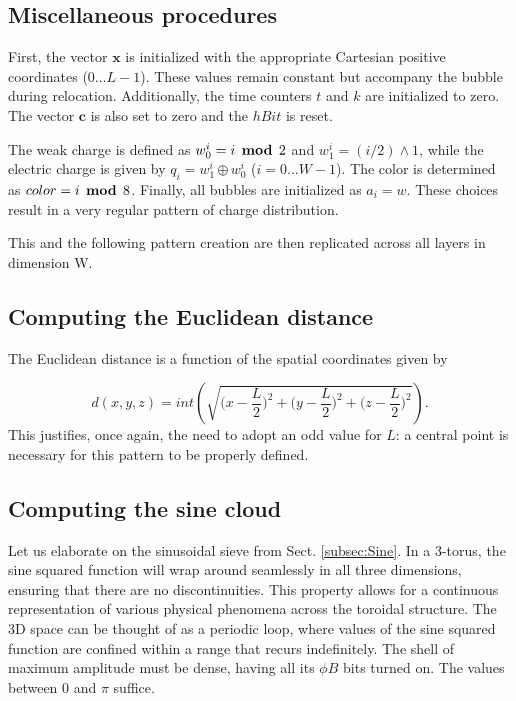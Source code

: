 \documentclass[12pt,english]{article}
\begin{document}
\subsection{Miscellaneous procedures}

First, the vector $\boldsymbol{x}$ is initialized with the appropriate Cartesian positive coordinates ($0 \dots L-1$). These values remain constant but accompany the bubble during relocation. Additionally, the time counters $t$ and $k$ are initialized to zero. The vector $\mathbf{c}$ is also set to zero and the $hBit$ is reset.
 
The weak charge is defined as $w_{0}^{i} = i \,\boldsymbol{\bmod}\, 2$ and $w_{1}^{i} = (i / 2) \land 1$, while the electric charge is given by $q_{i} = w_{1}^{i} \,\boldsymbol{\oplus}\, w_{0}^{i}$ ($i=0...W-1$). The color is determined as $color = i \,\boldsymbol{\bmod}\, 8$. Finally, all bubbles are initialized as $a_{i} = w$. These choices result in a very regular pattern of charge distribution.

This and the following pattern creation are then replicated across all layers in dimension W.

\subsection{Computing the Euclidean distance}
The Euclidean distance is a function of the spatial coordinates given by

\[
d(x,y,z)=int\left(\sqrt{\bigg(x-\frac{L}{2}\bigg)^{2}+\bigg(y-\frac{L}{2}\bigg)^{2}+\bigg(z-\frac{L}{2}\bigg)^{2}}\right).
\]
This justifies, once again, the need to adopt an odd value for $L$: a central point is necessary for this pattern to be properly defined. 

\subsection{Computing the sine cloud} \label{subsec:sine-cloud}
Let us elaborate on the sinusoidal sieve from Sect. \ref{subsec:Sine}. In a 3-torus, the sine squared function will wrap around seamlessly in all three dimensions, ensuring that there are no discontinuities. This property allows for a continuous representation of various physical phenomena across the toroidal structure. The 3D space can be thought of as a periodic loop, where values of the sine squared function are confined within a range that recurs indefinitely. The shell of maximum amplitude must be dense, having all its $\phi B$ bits turned on. The values between $0$ and $\pi$ suffice.
\end{document}
